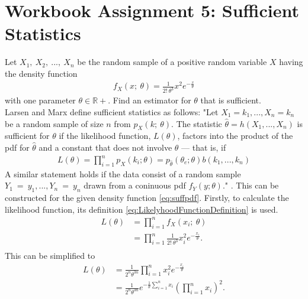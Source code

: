 \chapter{Workbook Assignment 5: Sufficient Statistics}	
Let $X_1,~X_2,~...,~X_n$ be the random sample of a positive random variable $X$ having the density function 
\begin{equation}
\begin{split}
f_X(x;~\theta) = \frac{1}{2!~\theta^3}x^2e^{-\frac{x}{\theta}}
\end{split}
\label{eq:suffpdf}
\end{equation}
with one parameter $\theta \in \mathbb{R}+$. Find an estimator for $\theta$ that is sufficient. 
\\
Larsen and Marx define sufficient statistics as follows: "Let $X_1 = k_1, . . . , X_n = k_n$ be a random sample of size $n$ from $p_X(k;~\theta)$. The statistic $\hat{\theta} = h(X_1, . . . , X_n)$ is sufficient for $\theta$ if the likelihood function, $L(\theta)$, factors into the product of the pdf for $\hat{\theta}$ and a constant that does not involve $\theta$ — that is, if
\begin{equation}
\begin{split}
L(\theta) 
= \prod_{i=1}^n p_X(k_i;\theta)
=p_{\hat{\theta}}(\theta_e;\theta)b(k_1,...,k_n)
\end{split}
\label{eq:SufficientLikelihood}
\end{equation}
A similar statement holds if the data consist of a random sample $Y_1~=~y_1,...,Y_n~=~ y_n$ drawn from a coninuous pdf $f_Y(y;\theta)$." \cite{larsen2005introduction}.
This can be constructed for the given density function \eqref{eq:suffpdf}. Firstly, to calculate the likelihood function, its definition \eqref{eq:LikelyhoodFunctionDefinition} is used.
\begin{equation}
\begin{split}
L(\theta) 
&= \prod_{i=1}^n f_X(x_i;~\theta)\\
&= \prod_{i=1}^n \frac{1}{2!~\theta^3}x_i^2e^{-\frac{x_i}{\theta}}.\\
\end{split}
\label{eq:SufficientLikelihood2}
\end{equation}
This can be simplified to 
\begin{equation}
\begin{split}
L(\theta) 
&= \frac{1}{2^n\theta^{3n}}\prod_{i=1}^n x_i^2e^{-\frac{x_i}{\theta}}\\
&= \frac{1}{2^n\theta^{3n}} e^{-\frac{1}{\theta}\sum_{i=1}^nx_i} \left(\prod_{i=1}^n x_i\right)^2.\\
\end{split}
\label{eq:SufficientLikelihood3}
\end{equation}
